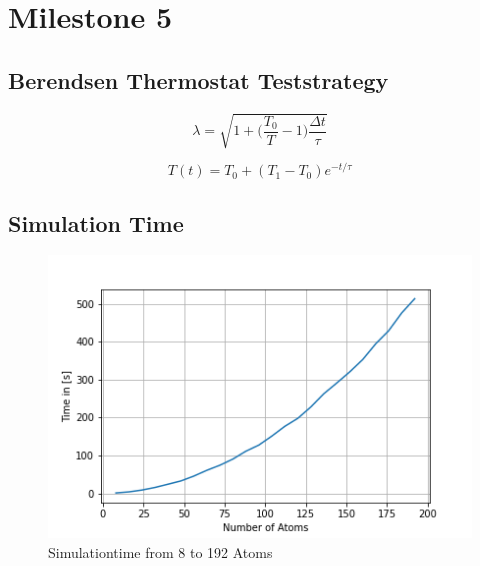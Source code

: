 \chapter{Milestone 5}
\section{Berendsen Thermostat Teststrategy}

\begin{equation}
	\lambda = \sqrt{1 + \bigg(\frac{T_{0}}{T} -1\bigg)\frac{\Delta t}{\tau}}
\end{equation}

\begin{equation}
	T(t) = T_{0} + (T_{1}-T_{0})e^{-t/\tau}
\end{equation}

\section{Simulation Time}

\begin{figure}[!h]
	\begin{center}
		\includegraphics[scale=1]{Figure/plotAtomTimes.png}
	\end{center}
	\caption[Simulationtime]{Simulationtime from 8 to 192 Atoms }
	\label{PlotAtomTimes}
\end{figure}


